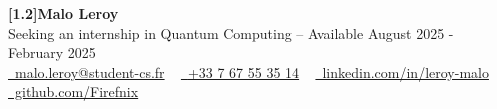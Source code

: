\begin{center}
    {\Huge\bfseries\sffamily \scalebox{1.0}[1.2]{Malo Leroy}}
    \\ Seeking an internship in Quantum Computing -- Available August 2025 - February 2025 \\
    \small
    \href{mailto:malo.leroy@student-cs.fr}{\raisebox{-0.2\height}\faEnvelope\  malo.leroy@student-cs.fr} ~
    \href{tel:+33767553514}{\raisebox{-0.2\height}\faPhone\  {+33 7 67 55 35 14}} ~
    \href{https://linkedin.com/in/leroy-malo}{\raisebox{-0.2\height}\faLinkedin\ linkedin.com/in/leroy-malo}  ~
    \href{https://github.com/Firefnix}{\raisebox{-0.2\height}\faGithub\ github.com/Firefnix}
\end{center}
